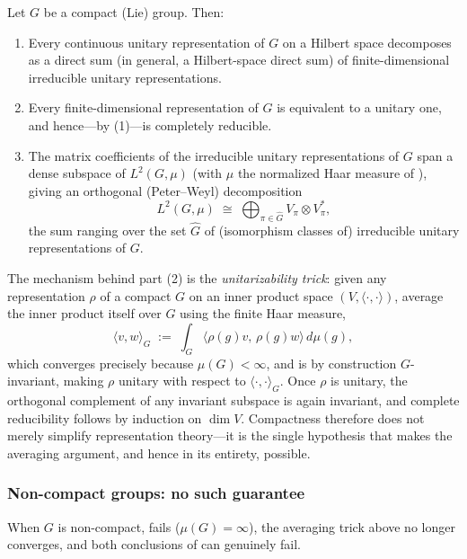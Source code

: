 \documentclass[mathematics,review,submit,moreauthors]{Definitions/mdpi}
\begin{document}
\begin{Theorem}
\label{thm:peter-weyl}
Let $G$ be a compact (Lie) group. Then:
\begin{enumerate}
    \item Every continuous unitary representation of $G$ on a Hilbert space
    decomposes as a direct sum (in general, a Hilbert-space direct sum) of
    finite-dimensional irreducible unitary representations.
    \item Every finite-dimensional representation of $G$ is equivalent to a
    unitary one, and hence---by (1)---is completely reducible.
    \item The matrix coefficients of the irreducible unitary representations
    of $G$ span a dense subspace of $L^2(G,\mu)$ (with $\mu$ the normalized
    Haar measure of ), giving an
    orthogonal (Peter--Weyl) decomposition
    \[
        L^2(G,\mu) \;\cong\; \bigoplus_{\pi \in \widehat{G}} V_\pi \otimes V_\pi^*,
    \]
    the sum ranging over the set $\widehat{G}$ of (isomorphism classes of)
    irreducible unitary representations of $G$.
\end{enumerate}
\end{Theorem}

The mechanism behind part (2) is the \emph{unitarizability trick}: given any
representation $\rho$ of a compact $G$ on an inner product space $(V,
\langle\cdot,\cdot\rangle)$, average the inner product itself over $G$ using
the finite Haar measure,
\[
    \langle v, w \rangle_G \;:=\; \int_G \langle \rho(g)v,\, \rho(g)w \rangle \, d\mu(g),
\]
which converges precisely because $\mu(G) < \infty$, and is by construction
$G$-invariant, making $\rho$ unitary with respect to $\langle\cdot,\cdot\rangle_G$.
Once $\rho$ is unitary, the orthogonal complement of any invariant subspace
is again invariant, and complete reducibility follows by induction on
$\dim V$. Compactness therefore does not merely simplify representation
theory---it is the single hypothesis that makes the averaging argument, and
hence  in its entirety, possible.

\subsubsection{Non-compact groups: no such guarantee}
\label{subsubsec:noncompact-representations}

When $G$ is non-compact,  fails
($\mu(G) = \infty$), the averaging trick above no longer converges, and both
conclusions of  can genuinely fail.
\end{document}
